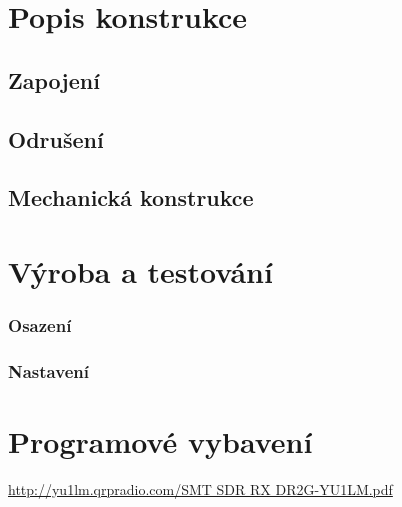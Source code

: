 \documentclass[12pt,a4paper,twoside]{article}
\begin{document}
\newpage
\section{Popis konstrukce}

\subsection{Zapojení}



\subsection{Odrušení}

\subsection{Mechanická konstrukce}

\section{Výroba a testování}

\subsubsection{Osazení}

\subsubsection{Nastavení}

\section{Programové vybavení}


\begin{thebibliography}{99}
\href{http://yu1lm.qrpradio.com/SMT SDR RX DR2G-YU1LM.pdf}{http://yu1lm.qrpradio.com/SMT SDR RX DR2G-YU1LM.pdf}

\end{thebibliography}
\end{document}

